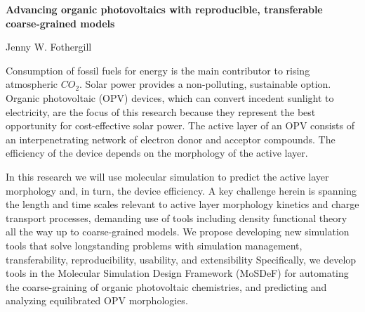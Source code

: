 \documentclass{article}
\begin{document}
\begin{center}
    \large{\textbf{Advancing organic photovoltaics with reproducible, transferable coarse-grained models}}
\end{center}
\begin{center}
    Jenny W. Fothergill
\end{center}

Consumption of fossil fuels for energy is the main contributor to rising atmospheric $CO_{2}$. 
Solar power provides a non-polluting, sustainable option.
Organic photovoltaic (OPV) devices, which can convert incedent sunlight to electricity, are the focus of this research because they represent the best opportunity for cost-effective solar power.
The active layer of an OPV consists of an interpenetrating network of electron donor and acceptor compounds.
The efficiency of the device depends on the morphology of the active layer.

In this research we will use molecular simulation to predict the active layer morphology and, in turn, the device efficiency.
A key challenge herein is spanning the length and time scales relevant to active layer morphology kinetics and charge transport processes, demanding use of tools including density functional theory all the way up to coarse-grained models.
We propose developing new simulation tools that solve longstanding problems with simulation management, transferability, reproducibility, usability, and extensibility
Specifically, we develop tools in the Molecular Simulation Design Framework (MoSDeF) for automating the coarse-graining of organic photovoltaic chemistries, and predicting and analyzing equilibrated OPV morphologies.
\end{document}
